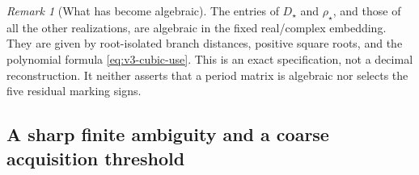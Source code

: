 \documentclass[11pt]{article}
\theoremstyle{definition}
\theoremstyle{remark}
\newtheorem{remark}[remark]{Remark}
\begin{document}
\begin{remark}[What has become algebraic]
The entries of $D_\star$ and $\rho_\star$, and those of all the other
realizations, are algebraic in the fixed real/complex embedding. They are
given by root-isolated branch distances, positive square roots, and the
polynomial formula \eqref{eq:v3-cubic-use}. This is an exact specification,
not a decimal reconstruction. It neither asserts that a period matrix is
algebraic nor selects the five residual marking signs.
\end{remark}

\subsection{A sharp finite ambiguity and a coarse acquisition threshold}
\end{document}
